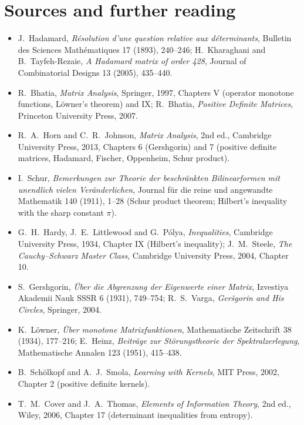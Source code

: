 \section*{Sources and further reading}

\begin{itemize}
\item J.~Hadamard, \emph{R\'esolution d'une question relative aux d\'eterminants}, Bulletin des Sciences Math\'ematiques 17 (1893),
240--246; H.~Kharaghani and B.~Tayfeh-Rezaie, \emph{A Hadamard matrix of order 428}, Journal of Combinatorial Designs 13 (2005), 435--440.
\item R.~Bhatia, \emph{Matrix Analysis}, Springer, 1997, Chapters V (operator monotone functions, L\"owner's theorem) and IX; R.~Bhatia,
\emph{Positive Definite Matrices}, Princeton University Press, 2007.
\item R.~A.~Horn and C.~R.~Johnson, \emph{Matrix Analysis}, 2nd ed., Cambridge University Press, 2013, Chapters 6 (Gershgorin) and 7
(positive definite matrices, Hadamard, Fischer, Oppenheim, Schur product).
\item I.~Schur, \emph{Bemerkungen zur Theorie der beschr\"ankten Bilinearformen mit unendlich vielen Ver\"anderlichen}, Journal f\"ur die
reine und angewandte Mathematik 140 (1911), 1--28 (Schur product theorem; Hilbert's inequality with the sharp constant $\pi$).
\item G.~H.~Hardy, J.~E.~Littlewood and G.~P\'olya, \emph{Inequalities}, Cambridge University Press, 1934, Chapter IX (Hilbert's inequality);
J.~M.~Steele, \emph{The Cauchy--Schwarz Master Class}, Cambridge University Press, 2004, Chapter 10.
\item S.~Gershgorin, \emph{\"Uber die Abgrenzung der Eigenwerte einer Matrix}, Izvestiya Akademii Nauk SSSR 6 (1931), 749--754; R.~S.~Varga,
\emph{Ger\v{s}gorin and His Circles}, Springer, 2004.
\item K.~L\"owner, \emph{\"Uber monotone Matrixfunktionen}, Mathematische Zeitschrift 38 (1934), 177--216; E.~Heinz, \emph{Beitr\"age zur
St\"orungstheorie der Spektralzerlegung}, Mathematische Annalen 123 (1951), 415--438.
\item B.~Sch\"olkopf and A.~J.~Smola, \emph{Learning with Kernels}, MIT Press, 2002, Chapter 2 (positive definite kernels).
\item T.~M.~Cover and J.~A.~Thomas, \emph{Elements of Information Theory}, 2nd ed., Wiley, 2006, Chapter 17 (determinant inequalities
from entropy).
\end{itemize}
